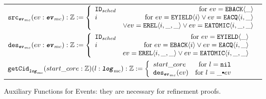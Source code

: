 \begin{figure}
\noindent{}

%
%

\begin{center}
\begin{tabular}{l}
$
\eventsourcefunckwd (ev : \mcevent) : \ztype := 
 \left\{\begin{array}{lr}
\schedid & \text{for } ev = \yieldbackev{\_} \\
i  & \text{for } ev =\yieldev{i}  \vee ev= \acqev{i}{\_} \\
   & \vee ev = \relev{i}{\_}{\_} \vee ev =  \atomicev{i}{\_}{\_}\\
\end{array} \right.
$\\
%
%
$
\eventdesfunckwd (ev : \mcevent) : \ztype := 
 \left\{\begin{array}{lr}
\schedid & \text{for } ev =\yieldev{\_} \\
i & \text{for } ev= \yieldbackev{i} \vee ev = \acqev{i}{\_}\\
   & ev=  \relev{i}{\_}{\_} \vee ev = \atomicev{i}{\_}{\_}\\
\end{array} \right.
$\\
%
%
$
\getcuridfromlogkwd (start\_core : \ztype) (l : \mclog): \ztype :=
 \left\{\begin{array}{lr}
start\_core & \text{for }  l = \nulllist \\
\eventdesfuncnoeq{ev} & \text{for } l = \listconsoppo{ev}{\_}\\
\end{array} \right.
$\\
\end{tabular}
\end{center}
\caption{Auxiliary Functions for Events: they are necessary for refinement proofs.}
\label{fig:chapter:conlink:auxiliary-functions-for-events-in-refinement}
\end{figure}


